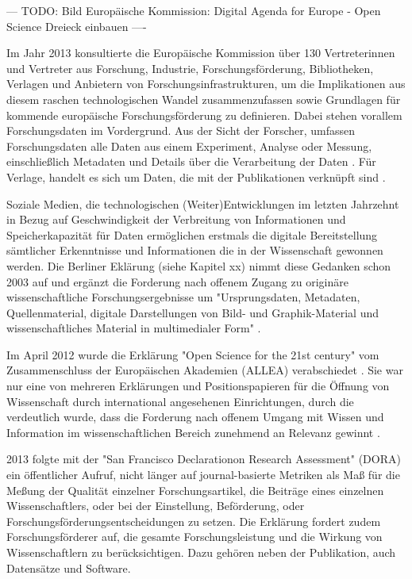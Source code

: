 --- TODO: Bild Europäische Kommission: Digital Agenda for Europe - Open Science Dreieck einbauen ----

Im Jahr 2013 konsultierte die Europäische Kommission über 130 Vertreterinnen und Vertreter aus Forschung, Industrie, Forschungsförderung, Bibliotheken, Verlagen und Anbietern von Forschungsinfrastrukturen, um die Implikationen aus diesem raschen technologischen Wandel zusammenzufassen sowie Grundlagen für kommende europäische Forschungsförderung zu definieren. Dabei stehen vorallem Forschungsdaten im Vordergrund. Aus der Sicht der Forscher, umfassen Forschungsdaten alle Daten aus einem Experiment, Analyse oder Messung, einschließlich Metadaten und Details über die Verarbeitung der Daten \cite{eu_consult_data_2013}. Für Verlage, handelt es sich um Daten, die mit der  Publikationen verknüpft sind \cite{eu_consult_data_2013}.

Soziale Medien, die technologischen (Weiter)Entwicklungen im letzten Jahrzehnt in Bezug auf Geschwindigkeit der Verbreitung von Informationen und Speicherkapazität für Daten ermöglichen erstmals die digitale Bereitstellung sämtlicher Erkenntnisse und Informationen die in der Wissenschaft gewonnen werden. Die Berliner Eklärung (siehe Kapitel xx) nimmt diese Gedanken schon 2003 auf und ergänzt die Forderung nach offenem Zugang zu originäre wissenschaftliche Forschungsergebnisse um "Ursprungsdaten, Metadaten, Quellenmaterial, digitale Darstellungen von Bild- und Graphik-Material und wissenschaftliches Material in multimedialer Form" \cite{berliner_erklaerung_2003}.

Im April 2012 wurde die Erklärung "Open Science for the 21st century" vom Zusammenschluss der Europäischen Akademien (ALLEA) verabschiedet \cite{ALLEA_2012}. Sie war nur eine von mehreren Erklärungen und Positionspapieren für die Öffnung von Wissenschaft durch international angesehenen Einrichtungen, durch die verdeutlich wurde, dass die Forderung nach offenem Umgang mit Wissen und Information im wissenschaftlichen Bereich zunehmend an Relevanz gewinnt \cite{schulze_2013_open}.

2013 folgte mit der "San Francisco Declarationon Research Assessment" (DORA) \cite{DORA_2013} ein öffentlicher Aufruf, nicht länger auf journal-basierte Metriken als Maß für die Meßung der Qualität einzelner Forschungsartikel, die Beiträge eines einzelnen Wissenschaftlers, oder bei der Einstellung, Beförderung, oder Forschungsförderungsentscheidungen zu setzen. Die Erklärung fordert zudem Forschungsförderer auf, die gesamte Forschungsleistung und die Wirkung von Wissenschaftlern zu berücksichtigen. Dazu gehören neben der Publikation, auch Datensätze und Software.

